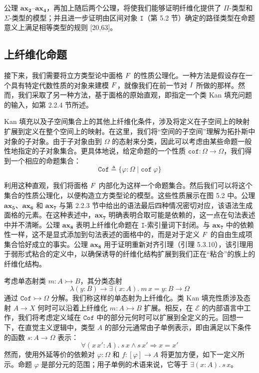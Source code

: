 \documentclass{ctexrep}
\let\mathbb\relax %
\theoremstyle{plain}
\theoremstyle{definition}
\theoremstyle{remark}
\newcommand{\Cof}{\mathtt{Cof}}
\newcommand{\ax}[1]{\mathbf{ax_{#1}}}
\begin{document}
公理 $\ax{2}$--$\ax{4}$，再加上随后两个公理，将使我们能够证明纤维化提供了 $\Pi$-类型和 $\Sigma$-类型的模型；并且进一步证明由区间对象 $\mathtt{I}$（第 5.2 节）确定的路径类型在命题意义上满足相等类型的规则 [20,63]。

\subsection{上纤维化命题}

接下来，我们需要将立方类型论中面格 $\mathbb{F}$ 的性质公理化。一种方法是假设存在一个具有特定代数性质的对象来建模 $\mathbb{F}$，就像我们在前一节对 $\mathbb{I}$ 所做的那样。然而，我们采取了另一种方法，基于面格的原始直观，即指定一个类 Kan 填充问题的输入，如第 2.2.4 节所述。

Kan 填充以及子空间集合上的其他上纤维化条件，涉及将定义在子空间上的映射扩展到定义在整个空间上的映射。在这里，我们将``空间的子空间''理解为拓扑斯中对象的子对象。由于子对象由到 $\Omega$ 的态射来分类，因此可以考虑由某些命题一般性地指定的子对象集合。更具体地说，给定命题的一个性质 $\mathtt{cof} : \Omega \to \Omega$，我们得到一个相应的命题集合：
\begin{equation}
\Cof \triangleq \{\varphi : \Omega \mid \mathtt{cof}\ \varphi\}
\end{equation}

利用这种直观，我们将面格 $\mathbb{F}$ 内部化为这样一个命题集合。然后我们可以将这个集合的性质公理化，以便构造立方类型论的模型。这些性质展示在图 5.2 中。公理 $\ax{5}$、$\ax{6}$ 和 $\ax{7}$ 与第 2.2.3 节中给出的语法最后四种情况密切对应，该语法生成面格的元素。在这种表述中，$\ax{7}$ 明确表明合取可能是依赖的，这一点在句法表述中并不清晰。公理 $\ax{8}$ 表明上纤维化命题在 $\mathtt{I}$-索引量词下封闭。与 $\ax{7}$ 中的依赖性一样，这不是显式添加到句法表述的面格中的，而是对于定义 $\mathbb{F}$ 的自由生成项集合恰好成立的事实。公理 $\ax{8}$ 用于证明重新对齐引理（引理 5.3.10），该引理用于弱形式粘合的定义中，以确保诱导的纤维化结构扩展到我们正在``粘合''的族上的纤维化结构。

考虑单态射类 $m : A \rightarrowtail B$，其分类态射
\[
\lambda(y : B) \to \exists(x : A).\ m\,x = y : B \to \Omega
\]
通过 $\Cof \rightarrowtail \Omega$ 分解。我们称这样的单态射为上纤维化。类 Kan 填充性质涉及态射 $A \to X$ 何时可以沿着上纤维化 $m : A \rightarrowtail B$ 扩展。相反，在 $\mathcal{E}$ 的内部语言中工作，我们将考虑定义域在 $\Cof$ 中的部分元何时可以扩展到全定义的元。回想一下，在直觉主义逻辑中，类型 $A$ 的部分元通常由子单例表示，即由满足以下条件的函数 $s : A \to \Omega$ 表示：
\[
\forall(x\,x' : A).\ s\,x \land s\,x' \Rightarrow x = x'
\]
然而，使用外延等价的依赖对 $\varphi : \Omega$ 和 $f : [\varphi] \to A$ 将更加方便，如下一定义所示。命题 $\varphi$ 是部分元的范围；用子单例的术语来说，它等于 $\exists(x : A).\ s\,x$。
\end{document}
